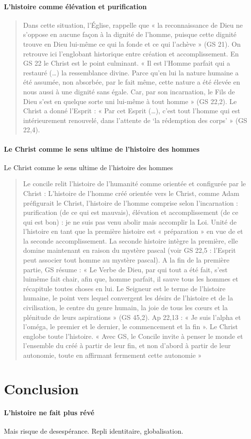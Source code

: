 \paragraph{L’histoire comme élévation et purification }
 
\begin{quote}
    Dans cette situation, l’Église, rappelle que « la reconnaissance de Dieu ne s’oppose en aucune façon à la dignité de l’homme, puisque cette dignité trouve en Dieu lui-même ce qui la fonde et ce qui l’achève » (GS 21). On retrouve ici l’englobant historique entre création et accomplissement. En GS 22 le Christ est le point culminant. « Il est l’Homme parfait qui a restauré (…) la ressemblance divine. Parce qu’en lui la nature humaine a été assumée, non absorbée, par le fait même, cette nature a été élevée en nous aussi à une dignité sans égale. Car, par son incarnation, le Fils de Dieu s’est en quelque sorte uni lui-même à tout homme » (GS 22,2). Le Christ a donné l’Esprit : « Par cet Esprit (…), c’est tout l’homme qui est intérieurement renouvelé, dans l’attente de ‘la rédemption des corps’ » (GS 22,4).
\end{quote}

\paragraph{Le Christ comme le sens ultime de l’histoire des hommes }
Le Christ comme le sens ultime de l’histoire des hommes
\begin{quote}
     Le concile relit l’histoire de l’humanité comme orientée et configurée par le Christ :  L’histoire de l’homme créé orientée vers le Christ, comme Adam préfigurait le Christ, l’histoire de l’homme comprise selon l’incarnation : purification (de ce qui est mauvais), élévation et accomplissement  (de ce qui est bon) : je ne suis pas venu abolir mais accomplir la Loi. Unité de l’histoire en tant que la première histoire est « préparation » en vue de et la seconde accomplissement. La seconde histoire intègre la première, elle domine maintenant en raison du mystère pascal (voir GS 22,5 : l’Esprit peut associer tout homme au mystère pascal). A la fin de la première partie, GS résume : « Le Verbe de Dieu, par qui tout a été fait, s’est luimême fait chair, afin que, homme parfait, il sauve tous les hommes et récapitule toutes choses en lui. Le Seigneur est le terme de l’histoire humaine, le point vers lequel convergent les désirs de l’histoire et de la civilisation, le centre du genre humain, la joie de tous les cœurs et la plénitude de leurs aspirations » (GS 45,2). Ap 22,13 : « Je suis l’alpha et l’oméga, le premier et le dernier, le commencement et la fin ». Le Christ englobe toute l’histoire. « Avec GS, le Concile invite à penser le monde et l’ensemble du créé à partir de leur fin, et non d’abord à partir de leur autonomie, toute en affirmant fermement cette autonomie » 
\end{quote}


\section{Conclusion}

\paragraph{L'histoire ne fait plus révé} Mais risque de desespérance. Repli identitaire, globalisation. 
